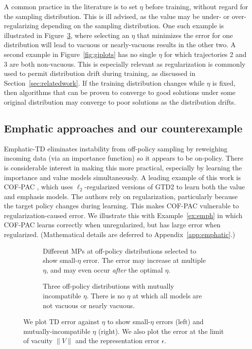 A common practice in the literature is to set $\eta$ before training, without regard for the sampling distribution. This is ill advised, as the value may be under- or over-regularizing depending on the sampling distribution. One such example is illustrated in Figure~\ref{fig:mismatchedeta}, where selecting an $\eta$ that minimizes the error for one distribution will lead to vacuous or nearly-vacuous results in the other two. A second example in Figure~\ref{fig:giplots} has no single $\eta$ for which trajectories 2 and 3 are both non-vacuous. This is especially relevant as regularization is commonly used to permit distribution drift during training, as discussed in Section~\ref{sec:relatedwork}. If the training distribution changes while $\eta$ is fixed, then algorithms that can be proven to converge to good solutions under some original distribution may converge to poor solutions as the distribution drifts.


\subsection{Emphatic approaches and our counterexample}
\label{sec:emphatictd}
Emphatic-TD eliminates instability from off-policy sampling by reweighing incoming data (via an importance function) so it appears to be on-policy. There is considerable interest in making this more practical, especially by learning the importance and value models simultaneously. A leading example of this work is COF-PAC \cite{zhang2020provably}, which uses $\ell_2$-regularized versions of GTD2 \cite{sutton2009fast} to learn both the value and emphasis models. The authors rely on regularization, particularly because the target policy changes during learning. This makes COF-PAC vulnerable to regularization-caused error. We illustrate this with Example~\ref{ex:emph} in which COF-PAC learns correctly when unregularized, but has large error when regularized. (Mathematical details are deferred to Appendix~\ref{app:emphatic}.)


\begin{figure}
  \begin{subfigure}[t]{0.48\textwidth}
    \centering
    
    \vspace{-1.25em}
    \caption{Different MPs at off-policy distributions selected to show small-$\eta$ error. The error may increase at multiple $\eta$, and may even occur \emph{after} the optimal $\eta$. }
    \label{fig:etagraph}
  \end{subfigure}
  \hfill
  \begin{subfigure}[t]{0.48\textwidth}
    \centering
    
    \caption{Three off-policy distributions with mutually incompatible $\eta$. There is no $\eta$ at which all models are not vacuous or nearly vacuous. }
    \label{fig:mismatchedeta}
  \end{subfigure}
  \caption{We plot TD error against $\eta$ to show small-$\eta$ errors (left) and mutually-incompatible $\eta$ (right). We also plot the error at the limit of vacuity $\|V\|$ and the representation error $\epsilon$. }
\end{figure}

